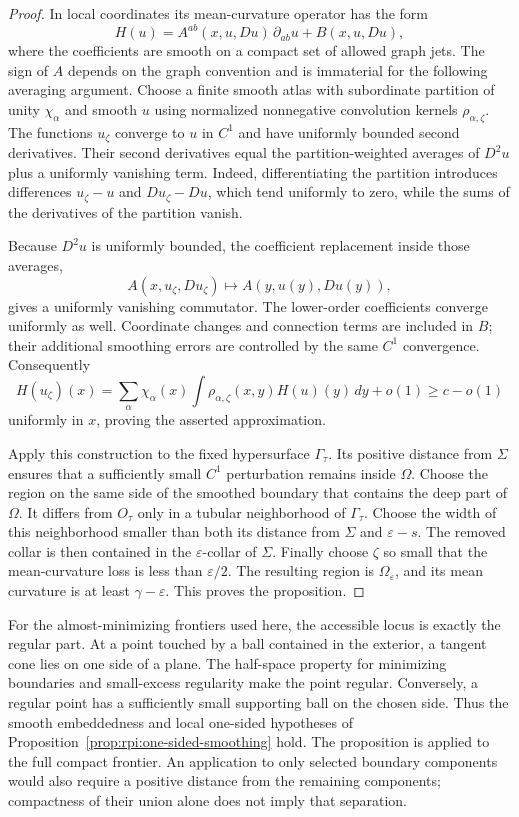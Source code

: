 \begin{proof}
In local coordinates its mean-curvature operator has the form
\[
 H(u)=A^{ab}(x,u,Du)\,\partial_{ab}u+B(x,u,Du),
\]
where the coefficients are smooth on a compact set of allowed graph
jets. The sign of $A$ depends on the graph convention and is immaterial
for the following averaging argument. Choose a finite smooth atlas
with subordinate partition of unity $\chi_\alpha$ and smooth $u$
using normalized nonnegative convolution kernels
$\rho_{\alpha,\zeta}$. The functions $u_\zeta$ converge to $u$ in
$C^1$ and have uniformly bounded second derivatives. Their second
derivatives equal the partition-weighted averages of $D^2u$ plus
a uniformly vanishing term. Indeed, differentiating the partition
introduces differences $u_\zeta-u$ and $Du_\zeta-Du$, which tend
uniformly to zero, while the sums of the derivatives of the partition
vanish.

Because $D^2u$ is uniformly bounded, the coefficient replacement
inside those averages,
\[
 A(x,u_\zeta,Du_\zeta)\longmapsto A(y,u(y),Du(y)),
\]
gives a uniformly vanishing commutator. The
lower-order coefficients converge uniformly as well. Coordinate
changes and connection terms are included in $B$; their additional
smoothing errors are controlled by the same $C^1$ convergence.
Consequently
\[
 H(u_\zeta)(x)
 =\sum_\alpha\chi_\alpha(x)
    \int\rho_{\alpha,\zeta}(x,y)H(u)(y)\,dy+o(1)
 \ge c-o(1)
\]
uniformly in $x$, proving the asserted approximation.

Apply this construction to the fixed hypersurface $\Gamma_\tau$.
Its positive distance from $\Sigma$ ensures that a sufficiently
small $C^1$ perturbation remains inside $\Omega$. Choose the region
on the same side of the smoothed boundary that contains the deep
part of $\Omega$. It differs from $O_\tau$ only in a tubular
neighborhood of $\Gamma_\tau$. Choose the width of this neighborhood
smaller than both its distance from $\Sigma$ and
$\varepsilon-s$. The removed collar is then contained in the
$\varepsilon$-collar of $\Sigma$. Finally choose $\zeta$ so small
that the mean-curvature loss is less than $\varepsilon/2$. The
resulting region is $\Omega_\varepsilon$, and its mean curvature is
at least $\gamma-\varepsilon$. This proves the proposition.
\end{proof}

For the almost-minimizing frontiers used here, the accessible locus
is exactly the regular part. At a point touched by a ball contained
in the exterior, a tangent cone lies on one side of a plane. The
half-space property for minimizing boundaries and small-excess
regularity make the point regular. Conversely, a regular point has
a sufficiently small supporting ball on the chosen side. Thus the
smooth embeddedness and local one-sided hypotheses of
Proposition~\ref{prop:rpi:one-sided-smoothing} hold. The proposition
is applied to the full compact frontier. An application to only
selected boundary components would also require a positive distance
from the remaining components; compactness of their union alone
does not imply that separation.

